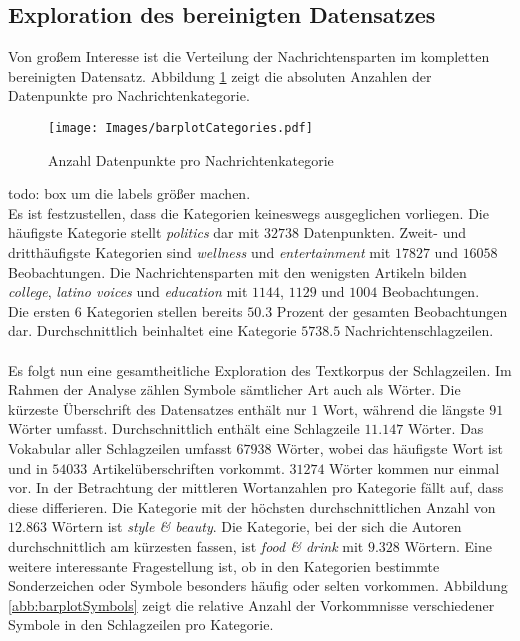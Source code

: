 \documentclass[a4paper,11pt]{article}
\begin{document}
\subsection{Exploration des bereinigten Datensatzes}

Von großem Interesse ist die Verteilung der Nachrichtensparten im kompletten bereinigten Datensatz.
Abbildung \ref{abb:barplotCategories} zeigt die absoluten Anzahlen der Datenpunkte pro Nachrichtenkategorie. 

\begin{figure}[ht]
    \centering
\texttt{[image: Images/barplotCategories.pdf]} 
\label{abb:barplotCategories}
\caption{Anzahl Datenpunkte pro Nachrichtenkategorie}
\end{figure}
todo: box um die labels größer machen.\\

Es ist festzustellen, dass die Kategorien keineswegs ausgeglichen vorliegen. Die häufigste Kategorie stellt \textit{politics} dar mit $32738$ Datenpunkten. Zweit- und dritthäufigste Kategorien sind \textit{wellness} und \textit{entertainment} mit $17827$ und $16058$ Beobachtungen. Die Nachrichtensparten mit den wenigsten Artikeln bilden \textit{college}, \textit{latino voices} und \textit{education} mit $1144$, $1129$ und $1004$ Beobachtungen.\\
Die ersten $6$ Kategorien stellen bereits $50.3$ Prozent der gesamten Beobachtungen dar. Durchschnittlich beinhaltet eine Kategorie $5738.5$ Nachrichtenschlagzeilen.\\
\\
Es folgt nun eine gesamtheitliche Exploration des Textkorpus der Schlagzeilen. Im Rahmen der Analyse zählen Symbole sämtlicher Art auch als Wörter. Die kürzeste Überschrift des Datensatzes enthält nur $1$ Wort, während die längste $91$ Wörter umfasst. Durchschnittlich enthält eine Schlagzeile $11.147$ Wörter. Das Vokabular aller Schlagzeilen umfasst $67938$ Wörter, wobei  das häufigste Wort ist und in $54033$ Artikelüberschriften vorkommt. $31274$ Wörter kommen nur einmal vor. In der Betrachtung der mittleren Wortanzahlen pro Kategorie fällt auf, dass diese differieren. Die Kategorie mit der höchsten durchschnittlichen Anzahl von $12.863$ Wörtern ist \textit{style \& beauty}. Die Kategorie, bei der sich die Autoren durchschnittlich am kürzesten fassen, ist \textit{food \& drink} mit $9.328$ Wörtern. Eine weitere interessante Fragestellung ist, ob in den Kategorien bestimmte Sonderzeichen oder Symbole besonders häufig oder selten vorkommen. Abbildung \ref{abb:barplotSymbols} zeigt die relative Anzahl der Vorkommnisse verschiedener Symbole in den Schlagzeilen pro Kategorie.
\end{document}
